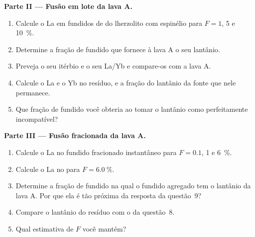\begin{problem}
\medskip\noindent\textbf{Parte II --- Fusão em lote da lava A.}
\begin{enumerate}[resume]
\item Calcule o La em fundidos de  do lherzolito com espinélio para $F = 1$, 5 e
\qty{10}{\percent}.
\item Determine a fração de fundido que fornece à lava A o seu lantânio.
\item Preveja o seu itérbio e o seu La/Yb e compare-os com a lava A.
\item Calcule o La e o Yb no resíduo, e a fração do lantânio da
fonte que nele permanece.
\item Que fração de fundido você obteria ao tomar o lantânio como
perfeitamente incompatível?
\end{enumerate}

\medskip\noindent\textbf{Parte III --- Fusão fracionada da lava A.}
\begin{enumerate}[resume]
\item Calcule o La no fundido fracionado instantâneo para $F = 0.1$, 1 e
\qty{6}{\percent}.
\item Calcule o La no  para $F = \qty{6.0}{\percent}$.
\item Determine a fração de fundido na qual o fundido agregado tem o lantânio da
lava A. Por que ela é tão próxima da resposta da questão~9?
\item Compare o lantânio do resíduo com o da questão~8.
\item Qual estimativa de $F$ você mantém?
\end{enumerate}


\end{problem}
